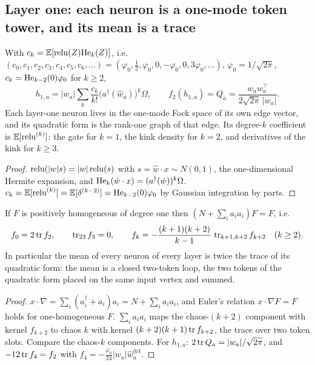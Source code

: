 \subsection{Layer one: each neuron is a one-mode token tower, and its mean is a trace}
\begin{proposition}\label{prop:ridge}
With $c_k=\mathbb E[\operatorname{relu}(Z)\mathrm{He}_k(Z)]$, i.e.\ $(c_0,c_1,c_2,c_3,c_4,c_5,c_6,\dots)=(\varphi_0,\tfrac12,\varphi_0,0,-\varphi_0,0,3\varphi_0,\dots)$,
$\varphi_0=1/\sqrt{2\pi}$, $c_k=\mathrm{He}_{k-2}(0)\varphi_0$ for $k\ge2$,
\[
h_{1,a}=|w_a|\sum_k\frac{c_k}{k!}\big(a^\dagger(\hat w_a)\big)^k\Omega ,\qquad
f_2(h_{1,a})=Q_a=\frac{w_aw_a^{\top}}{2\sqrt{2\pi}\,|w_a|}.
\]
Each layer-one neuron lives in the one-mode Fock space of its own edge vector, and its quadratic form is the rank-one
graph of that edge. Its degree-$k$ coefficient is $\mathbb E[\operatorname{relu}^{(k)}]$: the gate for $k=1$, the kink density for $k=2$, and
derivatives of the kink for $k\ge3$.
\end{proposition}
\begin{proof}
$\operatorname{relu}(|w|s)=|w|\operatorname{relu}(s)$ with $s=\hat w\cdot x\sim N(0,1)$, the one-dimensional Hermite expansion, and $\mathrm{He}_k(\hat w\cdot x)=
(a^\dagger(\hat w))^k\Omega$. $c_k=\mathbb E[\operatorname{relu}^{(k)}]=\mathbb E[\delta^{(k-2)}]=\mathrm{He}_{k-2}(0)\varphi_0$ by Gaussian integration by parts.
\end{proof}

\begin{theorem}\label{thm:ladder}
If $F$ is positively homogeneous of degree one then $(N+\sum_ia_ia_i)F=F$, i.e.
\[
f_0=2\operatorname{tr} f_2,\qquad \operatorname{tr}_{23}f_3=0,\qquad f_k=-\frac{(k+1)(k+2)}{k-1}\,\operatorname{tr}_{k+1,k+2}f_{k+2}\quad(k\ge2).
\]
In particular the mean of every neuron of every layer is twice the trace of its quadratic form: the mean is a closed
two-token loop, the two tokens of the quadratic form placed on the same input vertex and summed.
\end{theorem}
\begin{proof}
$x\cdot\nabla=\sum_i(a_i^\dagger+a_i)a_i=N+\sum_ia_ia_i$, and Euler's relation $x\cdot\nabla F=F$ holds for one-homogeneous $F$.
$\sum_ia_ia_i$ maps the chaos-$(k+2)$ component with kernel $f_{k+2}$ to chaos $k$ with kernel $(k+2)(k+1)\operatorname{tr} f_{k+2}$, the trace over
two token slots. Compare the chaos-$k$ components. For $h_{1,a}$: $2\operatorname{tr} Q_a=|w_a|/\sqrt{2\pi}$, and $-12\operatorname{tr} f_4=f_2$ with
$f_4=-\tfrac{\varphi_0}{24}|w_a|\hat w_a^{\otimes4}$.
\end{proof}

